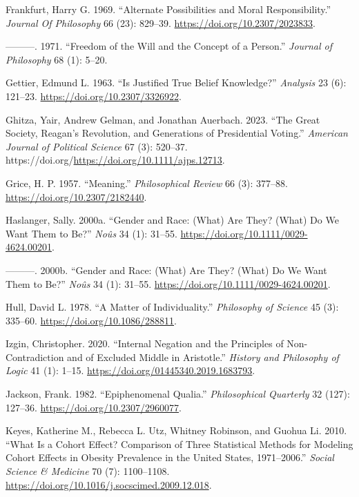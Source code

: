 \documentclass[
  12pt,
  letterpaper,
  DIV=11,
  numbers=noendperiod]{scrartcl}
\newlength{\cslhangindent}
\newenvironment{CSLReferences}[2] %
 {\begin{list}{}{%
  \setlength{\itemindent}{0pt}
  \setlength{\leftmargin}{0pt}
  \setlength{\parsep}{0pt}
  \ifodd #1
   \setlength{\leftmargin}{\cslhangindent}
   \setlength{\itemindent}{-1\cslhangindent}
  \fi
  \setlength{\itemsep}{#2\baselineskip}}}
 {\end{list}}
\begin{document}
\begin{CSLReferences}{1}{0}
Frankfurt, Harry G. 1969. {``Alternate Possibilities and Moral
Responsibility.''} \emph{Journal Of Philosophy} 66 (23): 829--39.
\url{https://doi.org/10.2307/2023833}.

---------. 1971. {``Freedom of the Will and the Concept of a Person.''}
\emph{Journal of Philosophy} 68 (1): 5--20.

Gettier, Edmund L. 1963. {``Is Justified True Belief Knowledge?''}
\emph{Analysis} 23 (6): 121--23. \url{https://doi.org/10.2307/3326922}.

Ghitza, Yair, Andrew Gelman, and Jonathan Auerbach. 2023. {``The Great
Society, Reagan's Revolution, and Generations of Presidential Voting.''}
\emph{American Journal of Political Science} 67 (3): 520--37.
https://doi.org/\url{https://doi.org/10.1111/ajps.12713}.

Grice, H. P. 1957. {``Meaning.''} \emph{Philosophical Review} 66 (3):
377--88. \url{https://doi.org/10.2307/2182440}.

Haslanger, Sally. 2000a. {``Gender and Race: (What) Are They? (What) Do
We Want Them to Be?''} \emph{No{û}s} 34 (1): 31--55.
\url{https://doi.org/10.1111/0029-4624.00201}.

---------. 2000b. {``Gender and Race: (What) Are They? (What) Do We Want
Them to Be?''} \emph{Noûs} 34 (1): 31--55.
\url{https://doi.org/10.1111/0029-4624.00201}.

Hull, David L. 1978. {``A Matter of Individuality.''} \emph{Philosophy
of Science} 45 (3): 335--60. \url{https://doi.org/10.1086/288811}.

Izgin, Christopher. 2020. {``Internal Negation and the Principles of
Non-Contradiction and of Excluded Middle in Aristotle.''} \emph{History
and Philosophy of Logic} 41 (1): 1--15.
\url{https://doi.org/01445340.2019.1683793}.

Jackson, Frank. 1982. {``Epiphenomenal Qualia.''} \emph{Philosophical
Quarterly} 32 (127): 127--36. \url{https://doi.org/10.2307/2960077}.

Keyes, Katherine M., Rebecca L. Utz, Whitney Robinson, and Guohua Li.
2010. {``What Is a Cohort Effect? Comparison of Three Statistical
Methods for Modeling Cohort Effects in Obesity Prevalence in the United
States, 1971--2006.''} \emph{Social Science \& Medicine} 70 (7):
1100--1108. \url{https://doi.org/10.1016/j.socscimed.2009.12.018}.


\end{CSLReferences}
\end{document}
